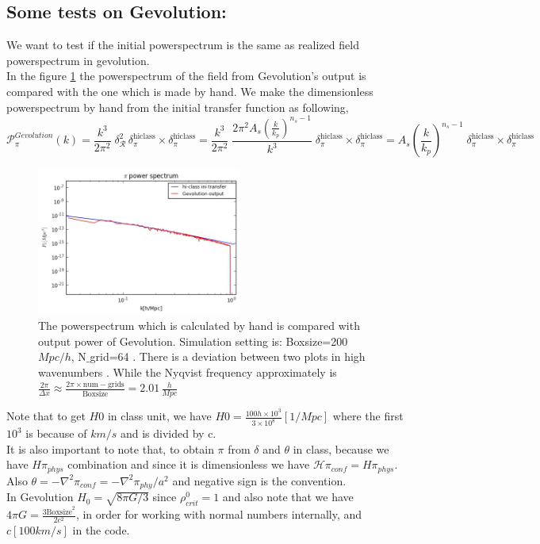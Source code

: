 \documentclass[a4paper,14pt]{article}
\newcommand {\be}{\begin{equation}}
\newcommand {\ee}{\end{equation}}
\begin{document}
 \subsection{Some tests on Gevolution:}
 We want to test if the initial powerspectrum is the same as realized field powerspectrum in gevolution. \\
 In the figure \ref{comparehi-gev} the powerspectrum of the field from Gevolution's output is compared with the one which is made by hand. We make the dimensionless powerspectrum by hand from the initial transfer function as following,
 \be
 \mathcal{P}_{\pi}^{Gevolution} (k) = \frac{k ^3}{2 \pi ^2} \; \delta_{\mathcal{R}}^2 \,  \delta_{\pi}
^{\text{hiclass}} \times  \delta_{\pi}^{\text{hiclass}} =  \frac{k ^3}{2 \pi ^2} \;    \frac{2 \pi^2 A_s(\frac{k}{k_p})^{n_s-1}}{k^{3}}  \;  \delta_{\pi}
^{\text{hiclass}} \times  \delta_{\pi}^{\text{hiclass}} =    { A_s(\frac{k}{k_p})^{n_s-1}} \;  \delta_{\pi}
^{\text{hiclass}} \times  \delta_{\pi}^{\text{hiclass}} 
 \ee
 \begin{figure}[htbp!]
\begin{center}
\captionsetup{,margin=1cm}
\includegraphics[width=0.60\textwidth]{Gev-hiclass} 
\caption{The powerspectrum which is calculated by hand is compared with output power of Gevolution. Simulation setting is: Boxsize=200 $Mpc/h$,  N$\_$grid=64 .  There is a deviation between two plots in high wavenumbers { \color{Red}{why?}}. While the Nyqvist frequency approximately is $\frac{2 \pi }{\Delta x} \approx  \frac{2 \pi \times \text{num}-{\text{grids}} }{\text{Boxsize}} =2.01 \, \frac{h}{Mpc}$}
\label{comparehi-gev}
\end{center}
\end{figure}
 Note that to get $H0$ in class unit, we have $H0=\frac{100h \times 10^3}{3 \times 10^8} [1/Mpc]$ where the first $10^3$ is because of $km/s$ and is divided by c. \\
 It is also important to note that, to obtain $\pi$ from $\delta $ and $\theta$ in class, because we have $H \pi_{phys}$ combination and since it is dimensionless we have $\mathcal{H} \pi_{conf} = H \pi_{phys}$. \\
 Also $\theta=-\nabla^2 \pi_{conf}=-\nabla^2 \pi_{phy}/a^2$ and negative sign is the convention. \\
 In Gevolution $H_{0}=\sqrt{8 \pi G/3}$ since $\rho_{crit}^0=1$ and also note that we have $4 \pi G= \frac{3 \text{Boxsize}^2}{2 c^2}$, in order for working with normal numbers internally, and $c[100km/s]$ in the code.
 
\end{document}
